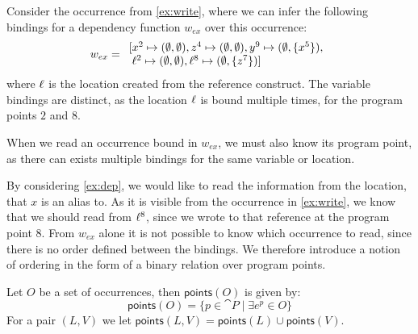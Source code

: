 \documentclass{llncs}
\newcommand{\sqleq}{\ensuremath{\sqsubseteq\xspace}}
\newcommand{\points}{\ensuremath{\textsf{points}}}
\begin{document}
\begin{example}\label{ex:dep}
	Consider the occurrence from \cref{ex:write}, where we can
        infer the following bindings for a dependency function
        $w_{ex}$ over this occurrence: 
	\[
          w_{ex}= \begin{array}{l}
                    [x^2\mapsto(\emptyset,\emptyset),z^4\mapsto(\emptyset,\emptyset),y^9\mapsto(\emptyset,\{x^5\}),
                    \\ \; \ell^2\mapsto(\emptyset,\emptyset),\ell^8\mapsto(\emptyset,\{z^7\})] \end{array} \]
	where $\ell$ is the location created from the reference construct.
	The variable bindings are distinct, as the location $\ell$ is
        bound multiple times, for the program points $2$ and $8$. 

        When we read an occurrence bound in $w_{ex}$, we must also
        know its program point, as there can exists multiple bindings
        for the same variable or location.
\end{example}

By considering \cref{ex:dep}, we would like to read the information
from the location, that $x$ is an alias to.  As it is visible from the
occurrence in \cref{ex:write}, we know that we should read from
$\ell^8$, since we wrote to that reference at the program point $8$.
From $w_{ex}$ alone it is not possible to know which occurrence to
read, since there is no order defined between the bindings.  We therefore
introduce a notion of ordering in the form of a binary relation over
program points.%



\begin{definition}\label{def:OccPP}
	Let $O$ be a set of occurrences, then $\points(O)$ is given by:
	\[ \points(O)=\{p\in\cat{P}\mid\exists e^p\in O\} \]
        For a pair $(L,V)$ we let $\points(L,V) = \points(L) \cup \points(V)$.
\end{definition}
\end{document}
